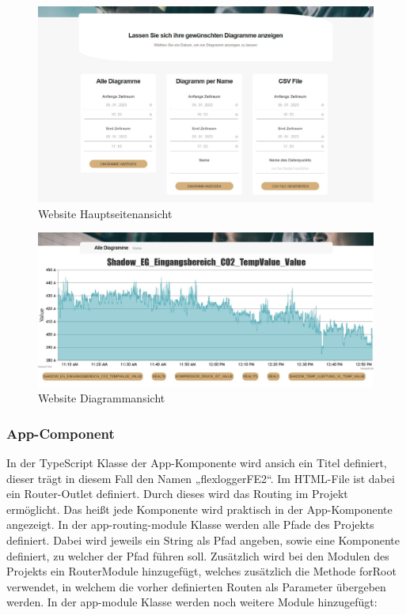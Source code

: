\begin{figure}
    \centering
    \includegraphics[scale=0.45]{pics/FlexLoggerWebsiteFormulare.jpg}
    \caption{Website Hauptseitenansicht}
    \label{fig:impl:FlexLoggerHauptseitenAnsicht}
\end{figure}

\begin{figure}
    \centering
    \includegraphics[scale=0.35]{pics/FlexLoggerWebsiteDiagramm.jpg}
    \caption{Website Diagrammansicht}
    \label{fig:impl:FlexLoggerDiagrammAnsicht}
\end{figure}

\subsubsection{App-Component}
In der TypeScript Klasse der App-Komponente wird ansich ein Titel definiert, dieser trägt in diesem Fall den Namen „flexloggerFE2“. Im HTML-File ist dabei ein Router-Outlet definiert. Durch dieses wird das Routing im Projekt ermöglicht. Das heißt jede Komponente wird praktisch in der App-Komponente angezeigt. In der app-routing-module Klasse werden alle Pfade des Projekts definiert. Dabei wird jeweils ein String als Pfad angeben, sowie eine Komponente definiert, zu welcher der Pfad führen soll. Zusätzlich wird bei den Modulen des Projekts ein RouterModule hinzugefügt, welches zusätzlich die Methode forRoot verwendet, in welchem die vorher definierten Routen als Parameter übergeben werden. In der app-module Klasse werden noch weitere Module hinzugefügt: 

